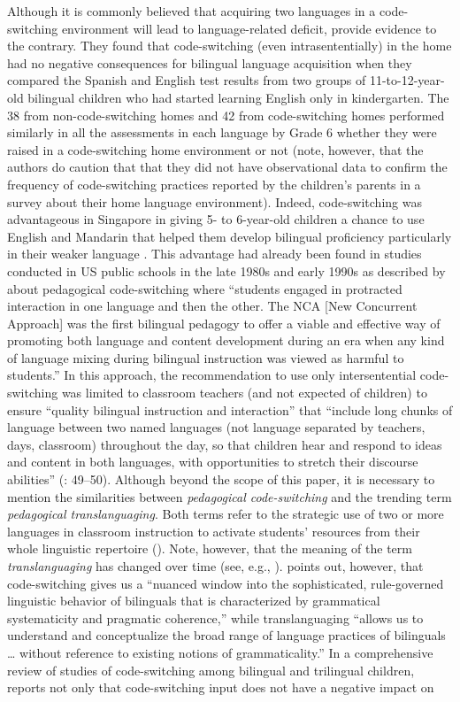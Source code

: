\documentclass[output=paper,colorlinks,citecolor=brown]{langscibook}
\begin{document}
Although it is commonly believed that acquiring two languages in a code-switching environment will lead to language-related deficit, \citet{MacSwanEtAl2019} provide evidence to the contrary. They found that code-switching (even intrasententially) in the home had no negative consequences for bilingual language acquisition when they compared the Spanish and English test results from two groups of 11-to-12-year-old bilingual children who had started learning English only in kindergarten. The 38 from non-code-switching homes and 42 from code-switching homes performed similarly in all the assessments in each language by Grade 6 whether they were raised in a code-switching home environment or not (note, however, that the authors do caution that that they did not have observational data to confirm the frequency of code-switching practices reported by the children’s parents in a survey about their home language environment). Indeed, code-switching was advantageous in Singapore in giving 5- to 6-year-old children a chance to use English and Mandarin that helped them develop bilingual proficiency particularly in their weaker language \citep{YowEtAl2018}. This advantage had already been found in studies conducted in US public schools in the late 1980s and early 1990s as described by \citet[47]{Faltis2019} about pedagogical code-switching where “students engaged in protracted interaction in one language and then the other. The NCA [New Concurrent Approach] was the first bilingual pedagogy to offer a viable and effective way of promoting both language and content development during an era when any kind of language mixing during bilingual instruction was viewed as harmful to students.” In this approach, the recommendation to use only intersentential code-switching was limited to classroom teachers (and not expected of children) to ensure “quality bilingual instruction and interaction” that “include long chunks of language between two named languages (not language separated by teachers, days, classroom) throughout the day, so that children hear and respond to ideas and content in both languages, with opportunities to stretch their discourse abilities” (\citealt{Faltis2019}: 49–50). Although beyond the scope of this paper, it is necessary to mention the similarities between \textit{pedagogical code-switching} and the trending term \textit{pedagogical translanguaging}. Both terms refer to the strategic use of two or more languages in classroom instruction to activate students’ resources from their whole linguistic repertoire (\citealt{CenozGorter2022}). Note, however, that the meaning of the term \textit{translanguaging} has changed over time (see, e.g., \citealt{Balam2021}). \citet[165]{Gort2019} points out, however, that code-switching gives us a “nuanced window into the sophisticated, rule-governed linguistic behavior of bilinguals that is characterized by grammatical systematicity and pragmatic coherence,” while translanguaging “allows us to understand and conceptualize the broad range of language practices of bilinguals … without reference to existing notions of grammaticality.” In a comprehensive review of studies of code-switching among bilingual and trilingual children, \citet[193]{Treffers-Daller2022} reports not only that code-switching input does not have a negative impact on 
\end{document}
